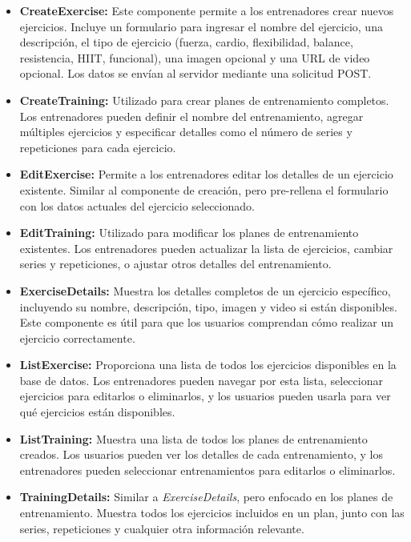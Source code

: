 \begin{itemize}
    \item \textbf{CreateExercise:} Este componente permite a los entrenadores crear nuevos ejercicios. Incluye un formulario para ingresar el nombre del ejercicio, una descripción, el tipo de ejercicio (fuerza, cardio, flexibilidad, balance, resistencia, HIIT, funcional), una imagen opcional y una URL de video opcional. Los datos se envían al servidor mediante una solicitud POST.
    
    \item \textbf{CreateTraining:} Utilizado para crear planes de entrenamiento completos. Los entrenadores pueden definir el nombre del entrenamiento, agregar múltiples ejercicios y especificar detalles como el número de series y repeticiones para cada ejercicio.
    
    \item \textbf{EditExercise:} Permite a los entrenadores editar los detalles de un ejercicio existente. Similar al componente de creación, pero pre-rellena el formulario con los datos actuales del ejercicio seleccionado.
    
    \item \textbf{EditTraining:} Utilizado para modificar los planes de entrenamiento existentes. Los entrenadores pueden actualizar la lista de ejercicios, cambiar series y repeticiones, o ajustar otros detalles del entrenamiento.
    
    \item \textbf{ExerciseDetails:} Muestra los detalles completos de un ejercicio específico, incluyendo su nombre, descripción, tipo, imagen y video si están disponibles. Este componente es útil para que los usuarios comprendan cómo realizar un ejercicio correctamente.
    
    \item \textbf{ListExercise:} Proporciona una lista de todos los ejercicios disponibles en la base de datos. Los entrenadores pueden navegar por esta lista, seleccionar ejercicios para editarlos o eliminarlos, y los usuarios pueden usarla para ver qué ejercicios están disponibles.
    
    \item \textbf{ListTraining:} Muestra una lista de todos los planes de entrenamiento creados. Los usuarios pueden ver los detalles de cada entrenamiento, y los entrenadores pueden seleccionar entrenamientos para editarlos o eliminarlos.
    
    \item \textbf{TrainingDetails:} Similar a \textit{ExerciseDetails}, pero enfocado en los planes de entrenamiento. Muestra todos los ejercicios incluidos en un plan, junto con las series, repeticiones y cualquier otra información relevante.
\end{itemize}

